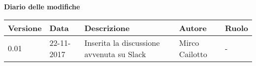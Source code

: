 \documentclass[main.tex]{subfiles}
\begin{document}
\huge \bfseries Diario delle modifiche\\
\begin{table}[htbp]
	\centering
	\renewcommand\arraystretch{1.2}

	\begin{tabularx}{\textwidth}{p{2cm}|p{2cm}|p{3cm}|p{2cm}|p{3cm}}
		\hline
		\textbf{Versione} & \textbf{Data} & \textbf{Descrizione} & \textbf{Autore} & \textbf{Ruolo}\\
		\hline
		0.01 & 22-11-2017 & Inserita la discussione avvenuta su Slack & Mirco Cailotto & -\\
	
	\end{tabularx}

\end{table}
\end{document}
